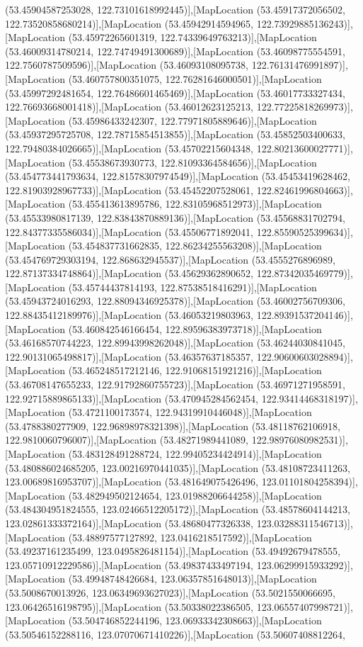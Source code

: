 (53.45904587253028, 122.73101618992445)],[MapLocation (53.45917372056502, 122.73520858680214)],[MapLocation (53.45942914594965, 122.73929885136243)],[MapLocation (53.45972265601319, 122.74339649763213)],[MapLocation (53.46009314780214, 122.74749491300689)],[MapLocation (53.46098775554591, 122.7560787509596)],[MapLocation (53.46093108095738, 122.76131476991897)],[MapLocation (53.460757800351075, 122.76281646000501)],[MapLocation (53.45997292481654, 122.76486601465469)],[MapLocation (53.46017733327434, 122.76693668001418)],[MapLocation (53.46012623125213, 122.77225818269973)],[MapLocation (53.45986433242307, 122.77971805889646)],[MapLocation (53.45937295725708, 122.78715854513855)],[MapLocation (53.45852503400633, 122.79480384026665)],[MapLocation (53.45702215604348, 122.80213600027771)],[MapLocation (53.45538673930773, 122.81093364584656)],[MapLocation (53.454773441793634, 122.81578307974549)],[MapLocation (53.45453419628462, 122.81903928967733)],[MapLocation (53.45452207528061, 122.82461996804663)],[MapLocation (53.455413613895786, 122.83105968512973)],[MapLocation (53.45533980817139, 122.83843870889136)],[MapLocation (53.45568831702794, 122.84377335586034)],[MapLocation (53.45506771892041, 122.85590525399634)],[MapLocation (53.454837731662835, 122.86234255563208)],[MapLocation (53.454769729303194, 122.868632945537)],[MapLocation (53.4555276896989, 122.87137334748864)],[MapLocation (53.45629362890652, 122.87342035469779)],[MapLocation (53.45744437814193, 122.87538518416291)],[MapLocation (53.45943724016293, 122.88094346925378)],[MapLocation (53.46002756709306, 122.88435412189976)],[MapLocation (53.46053219803963, 122.89391537204146)],[MapLocation (53.460842546166454, 122.89596383973718)],[MapLocation (53.46168570744223, 122.89943998262048)],[MapLocation (53.46244030841045, 122.90131065498817)],[MapLocation (53.46357637185357, 122.90600603028894)],[MapLocation (53.465248517212146, 122.91068151921216)],[MapLocation (53.46708147655233, 122.91792860755723)],[MapLocation (53.46971271958591, 122.92715889865133)],[MapLocation (53.470945284562454, 122.93414468318197)],[MapLocation (53.4721100173574, 122.94319910446048)],[MapLocation (53.4788380277909, 122.96898978321398)],[MapLocation (53.48118762106918, 122.9810060796007)],[MapLocation (53.48271989441089, 122.98976080982531)],[MapLocation (53.483128491288724, 122.99405234424914)],[MapLocation (53.480886024685205, 123.00216970441035)],[MapLocation (53.48108723411263, 123.00689816953707)],[MapLocation (53.481649075426496, 123.01101804258394)],[MapLocation (53.482949502124654, 123.01988206644258)],[MapLocation (53.484304951824555, 123.02466512205172)],[MapLocation (53.48578604144213, 123.02861333372164)],[MapLocation (53.48680477326338, 123.03288311546713)],[MapLocation (53.48897577127892, 123.0416218517592)],[MapLocation (53.49237161235499, 123.0495826481154)],[MapLocation (53.49492679478555, 123.05710912229586)],[MapLocation (53.49837433497194, 123.06299915933292)],[MapLocation (53.49948748426684, 123.06357851648013)],[MapLocation (53.5008670013926, 123.06349693627023)],[MapLocation (53.5021550066695, 123.06426516198795)],[MapLocation (53.50338022386505, 123.06557407998721)],[MapLocation (53.504746852244196, 123.06933342308663)],[MapLocation (53.50546152288116, 123.07070671410226)],[MapLocation (53.50607408812264, 